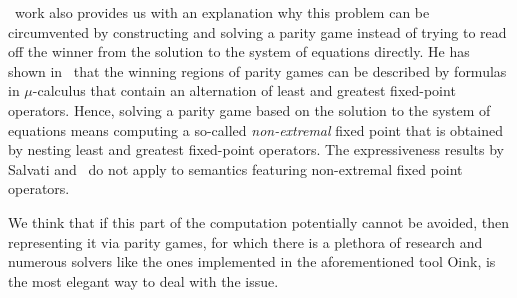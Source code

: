 \documentclass[../../diss.tex]{subfiles}
\begin{document}
\Walus~work also provides us with an explanation why this problem can be circumvented by constructing and solving a parity game instead of trying to read off the winner from the solution to the system of equations directly.
He has shown in~\cite{Walukiewicz02} that the winning regions of parity games can be described by formulas in $\mu$-calculus that contain an alternation of least and greatest fixed-point operators.
Hence, solving a parity game based on the solution to the system of equations means computing a so-called \emph{non-extremal} fixed point that is obtained by nesting least and greatest fixed-point operators.
The expressiveness results by Salvati and \Walu~do not apply to semantics featuring non-extremal fixed point operators.

We think that if this part of the computation potentially cannot be avoided, then representing it via parity games, for which there is a plethora of research and numerous solvers like the ones implemented in the aforementioned tool Oink, is the most elegant way to deal with the issue.
\end{document}
